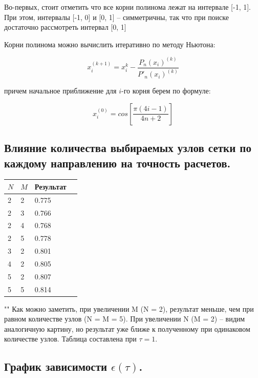 \documentclass[a4paper,12pt]{article}
\begin{document}
\noindent Во-первых, стоит отметить что все корни полинома лежат на интервале [-1, 1]. При этом, интервалы [-1, 0] и [0, 1] -- симметричны, так что при поиске достаточно рассмотреть интервал [0, 1]

\noindent Корни полинома можно вычислить итеративно по методу Ньютона:

$$ x_{i}^{(k + 1)} = x_{i}^k - \frac{P_{n}(x_{i})^{(k)}}{P'_{n}(x_{i})^{(k)}}$$

\noindent причем начальное приближение для $i\text{-го корня}$ берем по формуле:

$$x_{i}^{(0)} = cos[\frac{\pi(4i - 1)}{4n + 2}]$$

\subsection{Влияние количества выбираемых узлов сетки по каждому направлению на точность расчетов.}

\begin{center}
	\begin{tabular}{ | l | l | l | p{1cm} |}
		\hline
		$N$ & $M$ & Результат \\ \hline
		2 & 2 & 0.775 \\ 
		2 & 3 & 0.766 \\ 
		2 & 4 & 0.768 \\ 
		2 & 5 & 0.778 \\ \hline
		3 & 2 & 0.801 \\ 
		4 & 2 & 0.805 \\ 
		5 & 2 & 0.807 \\
		5 & 5 & 0.814 \\				
		\hline
	\end{tabular}
\end{center}

""\newline
\noindent Как можно заметить, при увеличении M (N = 2), результат меньше, чем при равном количестве узлов (N = M = 5). При увеличении N (M = 2) -- видим аналогичную картину, но результат уже ближе к полученному при одинаковом количестве узлов. Таблица составлена при $\tau = 1$.

\subsection{График зависимости $\epsilon(\tau)$.}
\end{document}
